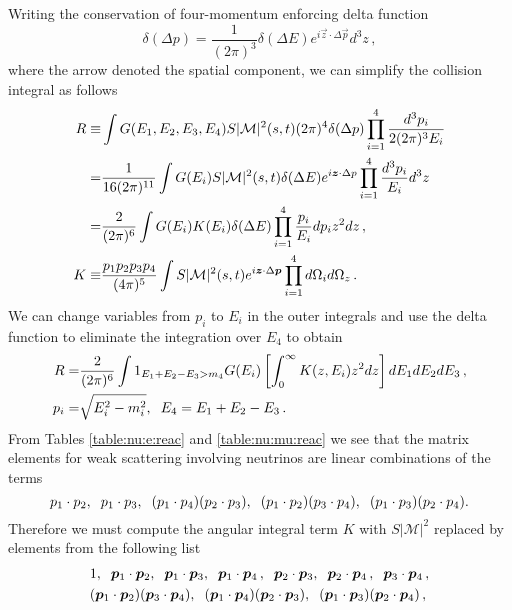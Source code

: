  Writing the conservation of four-momentum enforcing delta function
\begin{equation}
\delta(\Delta p)=\frac{1}{(2\pi)^3}\delta(\Delta E)e^{i\vec z\cdot \Delta \vec p}d^3z\,,
\end{equation}
where the arrow denoted the spatial component, we can simplify the collision integral as follows
\begin{align}
R\equiv&\int G(E_1,E_2,E_3,E_4) S|\mathcal{M}|^2(s,t)(2\pi)^4\delta(\Delta p)\prod_{i=1}^4\frac{d^3p_i}{2(2\pi)^3 E_i}\\
=&\frac{1}{16(2\pi)^{11}}\int G(E_i) S|\mathcal{M}|^2(s,t)\delta(\Delta E)e^{i\vec z\cdot\Delta p}\prod_{i=1}^4\frac{d^3p_i}{ E_i}d^3z\notag\\
=&\frac{2}{(2\pi)^{6}}\int G(E_i)K(E_i) \delta(\Delta E)\prod_{i=1}^4\frac{p_i}{E_i}dp_i z^2dz\,,\notag\\
K\equiv&\frac{p_1p_2p_3p_4}{(4\pi)^5}\int S|\mathcal{M}|^2(s,t)e^{i\vec z\cdot\Delta\vec p}\prod_{i=1}^4d\Omega_id\Omega_z\,.
\end{align}
We can change variables from $p_i$ to $E_i$ in the outer integrals and use the delta function to eliminate the integration over $E_4$ to obtain
\begin{align}
R=&\frac{2}{(2\pi)^{6}}\int1_{E_1+E_2-E_3>m_4}G(E_i)\left[\int_0^\infty K(z,E_i)z^2dz\right]dE_1dE_2dE_3\,,\\
p_i=&\sqrt{E_i^2-m_i^2},\hspace{2mm} E_4=E_1+E_2-E_3\,.\notag
\end{align}
From Tables \ref{table:nu:e:reac} and \ref{table:nu:mu:reac} we see that the matrix elements for weak scattering involving neutrinos are linear combinations of the terms
\begin{equation}
p_1\cdot p_2,\hspace{2mm} p_1\cdot p_3,\hspace{2mm}(p_1\cdot p_4)(p_2\cdot p_3), \hspace{2mm} (p_1\cdot p_2)(p_3\cdot p_4),\hspace{2mm} (p_1\cdot p_3)(p_2\cdot p_4).
\end{equation}
Therefore we must compute the angular integral term $K$ with $S|\mathcal{M}|^2$ replaced by elements from the following list
\begin{align}\label{matrixElementPieces}
&1,\hspace{2mm}\vec p_1 \cdot\vec p_2,\hspace{2mm}\vec p_1 \cdot\vec p_3,\hspace{2mm}\vec p_1 \cdot\vec p_4 \,,\hspace{2mm}\vec p_2\cdot\vec p_3,\hspace{2mm}\vec p_2\cdot\vec p_4 \,,\hspace{2mm}\vec p_3\cdot\vec p_4 \,,\\
& (\vec p_1 \cdot\vec p_2)(\vec p_3\cdot\vec p_4 ),\hspace{2mm}(\vec p_1 \cdot\vec p_4 )(\vec p_2\cdot\vec p_3),\hspace{2mm} (\vec p_1 \cdot\vec p_3)(\vec p_2\cdot\vec p_4 )\,,\notag
\end{align}
